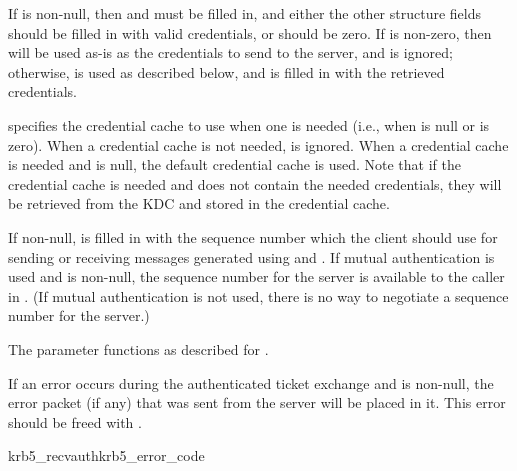 If  is non-null, then  and
 must be filled in, and either
the other structure fields should be filled in with valid credentials,
or  should be zero.  If
 is non-zero, then
 will be used as-is as the credentials to send to
the server, and  is ignored; otherwise,
 is used as described below, and 
is filled in with the retrieved credentials.

 specifies the credential cache to use when one is
needed (i.e., when  is null or
 is zero).  When a credential
cache is not needed,  is ignored.  When a credential
cache is needed and  is null, the default credential
cache is used.  Note that if the credential cache is needed and does
not contain the needed credentials, they will be retrieved from the
KDC and stored in the credential cache.

If non-null,  is filled in with the sequence number
which the client should use for sending or receiving messages generated
using  and .  If mutual
authentication is used and  is non-null, the
sequence number for the server is available to the caller in
.  (If mutual authentication is not
used, there is no way to negotiate a sequence number for the server.)

The  parameter functions as described for
.

If an error occurs during the authenticated ticket exchange and
 is non-null, the error packet (if any) that was sent
from the server will be placed in it.  This error should be freed with
.

\begin{funcdecl}{krb5_recvauth}{krb5_error_code}
\funcin
{}
\funcendfuncarg
{}
\funcout
{}
\end{funcdecl}

